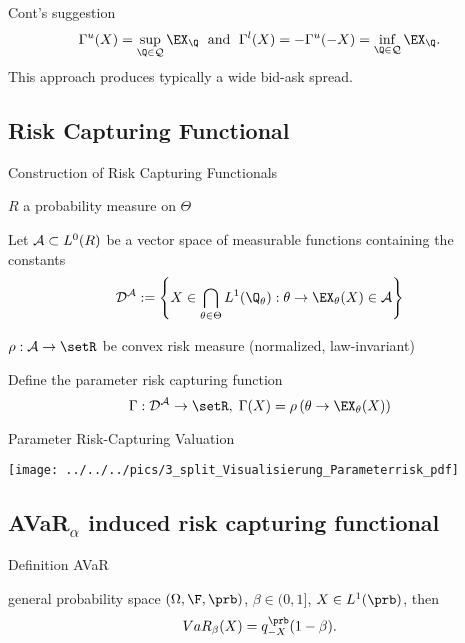 	Cont's suggestion
$$
\Gamma^u(X)=\sup_{\Q \in {\cal Q}} \EX_{\Q} \; \mbox{ and } \;
\Gamma^l(X)= -\Gamma^u(-X)=\inf_{\Q \in {\cal Q}} \EX_{\Q}.
$$
This approach produces typically a wide bid-ask spread.





\subsection{Risk Capturing Functional}

{Construction of Risk Capturing Functionals}






	$R$ a probability measure on $\Theta$


	Let ${\cal A} \subset L^0(R)$ be a vector space of measurable functions containing the constants
\begin{equation}
{\cal D^A} := \left\{ X \in \bigcap_{\theta \in \Theta}  L^1(\Q_\theta): \theta \rightarrow \EX_\theta(X) \in {\cal A} \right\}
\end{equation}


	$\rho: {\cal A} \rightarrow \setR$ be convex risk measure (normalized, law-invariant)


	

Define the parameter risk capturing function
\begin{equation}
\Gamma: {\cal D^A} \rightarrow \setR, \; \Gamma(X) = \rho\left(\theta \rightarrow \EX_\theta(X)\right)
\end{equation}





{Parameter Risk-Capturing Valuation}
\begin{center}
\texttt{[image: ../../../pics/3\_split\_Visualisierung\_Parameterrisk\_pdf]}
\end{center}

\subsection{AVaR$_\alpha$ induced risk capturing functional}

{Definition AVaR}






	general probability space $(\Omega, \F, \prb)$, $\beta \in (0,1]$, $X\in L^1(\prb)$, then
$$
VaR_\beta(X) = q_{-X}^{\prb}(1-\beta).
$$



